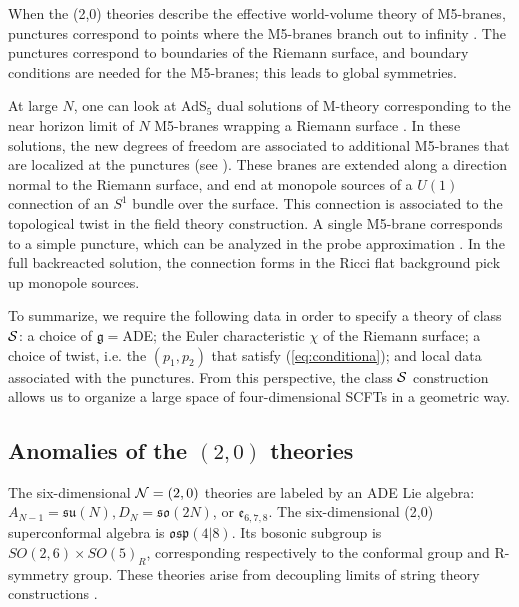 \documentclass[a4paper,11pt]{article}
\def\CN{{\cal N}}
\def\CS{{\cal S}}
\begin{document}
When the (2,0) theories describe the effective world-volume theory of M5-branes, punctures correspond to points where the M5-branes branch out to infinity \cite{Bah:2013qya}. 
The punctures correspond to boundaries of the Riemann surface, and boundary conditions are needed for the M5-branes; this leads to global symmetries. 

At large $N$, one can look at AdS$_5$ dual solutions of M-theory corresponding to the near horizon limit of $N$ M5-branes wrapping a Riemann surface \cite{Gaiotto:2009gz,Bah:2015fwa}. In these solutions, the new degrees of freedom are associated to additional M5-branes that are localized at the punctures (see  \cite{Bah:2013qya}). These branes are extended along a direction normal to the Riemann surface, and end at monopole sources of a $U(1)$ connection of an $S^1$ bundle over the surface.  This connection is associated to the topological twist in the field theory construction. A single M5-brane corresponds to a simple puncture, which can be analyzed in the probe approximation \cite{Gaiotto:2009gz,Bah:2013wda}. In the full backreacted solution, the connection forms in the Ricci flat background pick up monopole sources. 

To summarize, we require the following data in order to specify a theory of class $\CS$: a choice of $\mathfrak{g}=$ADE; the Euler characteristic $\chi$ of the Riemann surface; a choice of twist, i.e. the $(p_1,p_2)$ that satisfy (\ref{eq:conditiona}); and local data associated with the punctures.
From this perspective, the class $\CS$ construction allows us to organize a large space of four-dimensional SCFTs in a geometric way.







\subsection{Anomalies of the $(2,0)$ theories}%
\label{sec:anomalies20}

The six-dimensional $\CN=(2,0)$ theories are labeled by an ADE Lie algebra: $A_{N-1}=\mathfrak{su}(N),D_{N}=\mathfrak{so}(2N)$, or $\mathfrak{e}_{6,7,8}$. The six-dimensional (2,0) superconformal algebra is $\mathfrak{osp}(4|8)$. Its bosonic subgroup is $SO(2,6)\times  SO(5)_R$, corresponding respectively to the conformal group and R-symmetry group.
These theories arise from decoupling limits of string theory constructions \cite{Witten:1995zh,Strominger:1995ac,Witten:1995em}. 
\end{document}
